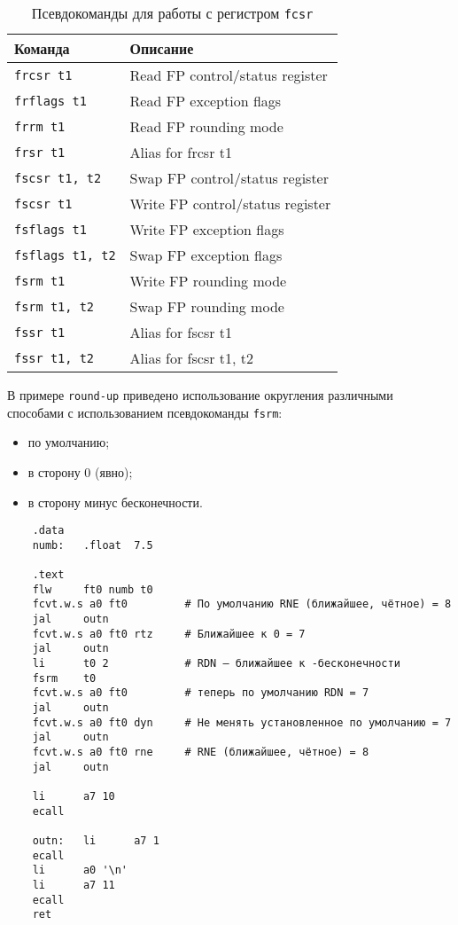 \begin{table}[h]
    \caption{Псевдокоманды для работы с регистром \texttt{fcsr}}
    \centering
    \begin{tabularx}{\textwidth}{|l|X|}
        \hline
        \textbf{Команда} & \textbf{Описание} \\
        \hline \verb|frcsr t1| & Read FP control/status register \\
        \hline \verb|frflags t1| & Read FP exception flags \\
        \hline \verb|frrm t1| & Read FP rounding mode \\
        \hline \verb|frsr t1| & Alias for frcsr t1 \\
        \hline \verb|fscsr t1, t2| & Swap FP control/status register \\
        \hline \verb|fscsr t1| & Write FP control/status register \\
        \hline \verb|fsflags t1| & Write FP exception flags \\
        \hline \verb|fsflags t1, t2| & Swap FP exception flags \\
        \hline \verb|fsrm t1| & Write FP rounding mode \\
        \hline \verb|fsrm t1, t2| & Swap FP rounding mode \\
        \hline \verb|fssr t1| & Alias for fscsr t1 \\
        \hline \verb|fssr t1, t2| & Alias for fscsr t1, t2 \\
        \hline
    \end{tabularx}
    \label{table-fcsr-pseudo}
\end{table}

В примере \verb|round-up| приведено использование округления различными способами с использованием псевдокоманды  \verb|fsrm|:
\begin{itemize}
    \item по умолчанию;
    \item в сторону 0 (явно);
    \item в сторону минус бесконечности.
\end{itemize}

\begin{verbatim}
    .data
    numb:   .float  7.5

    .text
    flw     ft0 numb t0
    fcvt.w.s a0 ft0         # По умолчанию RNE (ближайшее, чётное) = 8
    jal     outn
    fcvt.w.s a0 ft0 rtz     # Ближайшее к 0 = 7
    jal     outn
    li      t0 2            # RDN — ближайшее к -бесконечности
    fsrm    t0
    fcvt.w.s a0 ft0         # теперь по умолчанию RDN = 7
    jal     outn
    fcvt.w.s a0 ft0 dyn     # Не менять установленное по умолчанию = 7
    jal     outn
    fcvt.w.s a0 ft0 rne     # RNE (ближайшее, чётное) = 8
    jal     outn

    li      a7 10
    ecall

    outn:   li      a7 1
    ecall
    li      a0 '\n'
    li      a7 11
    ecall
    ret
\end{verbatim}

